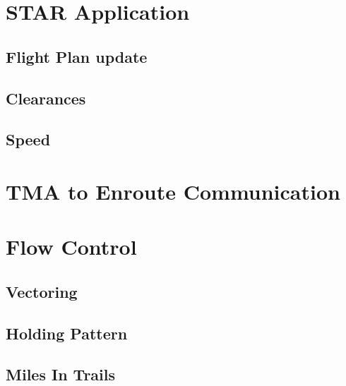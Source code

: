 





\section{STAR Application}
\subsection{Flight Plan update}
\subsection{Clearances}
\subsection{Speed}

\section{TMA to Enroute Communication}

\section{Flow Control}
\subsection{Vectoring}
\subsection{Holding Pattern}
\subsection{Miles In Trails}


